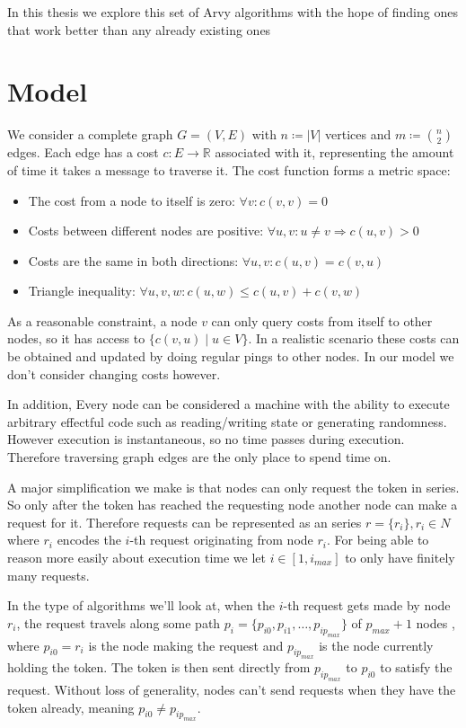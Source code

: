 \documentclass[a4paper, oneside]{discothesis}
\begin{document}
In this thesis we explore this set of Arvy algorithms with the hope of finding ones that work better than any already existing ones

\section{Model}

We consider a complete graph $G=(V,E)$ with $n\coloneqq|V|$ vertices and $m\coloneqq\binom{n}{2}$ edges. Each edge has a cost $c : E \rightarrow \mathbb{R}$ associated with it, representing the amount of time it takes a message to traverse it. The cost function forms a metric space:
\begin{itemize}
\item The cost from a node to itself is zero: $\forall v:c(v, v)=0$
\item Costs between different nodes are positive: $\forall u,v : u\neq v\Rightarrow c(u,v)>0$
\item Costs are the same in both directions: $\forall u,v : c(u,v)=c(v,u)$
\item Triangle inequality: $\forall u,v,w : c(u,w)\leq c(u,v)+c(v,w)$
\end{itemize}

As a reasonable constraint, a node $v$ can only query costs from itself to other nodes, so it has access to $\{c(v, u)\;|\;u\in V\}$. In a realistic scenario these costs can be obtained and updated by doing regular pings to other nodes. In our model we don't consider changing costs however.

In addition, Every node can be considered a machine with the ability to execute arbitrary effectful code such as reading/writing state or generating randomness. However execution is instantaneous, so no time passes during execution. Therefore traversing graph edges are the only place to spend time on.

A major simplification we make is that nodes can only request the token in series. So only after the token has reached the requesting node another node can make a request for it. Therefore requests can be represented as an series $r=\{r_i\},r_i\in N$ where $r_i$ encodes the $i$-th request originating from node $r_i$. For being able to reason more easily about execution time we let $i\in[1,i_{max}]$ to only have finitely many requests.

In the type of algorithms we'll look at, when the $i$-th request gets made by node $r_i$, the request travels along some path $p_i=\{p_{i0},p_{i1},\dots,p_{ip_{max}}\}$ of $p_{max}+1$ nodes , where $p_{i0}=r_i$ is the node making the request and $p_{ip_{max}}$ is the node currently holding the token. The token is then sent directly from $p_{ip_{max}}$ to $p_{i0}$ to satisfy the request. Without loss of generality, nodes can't send requests when they have the token already, meaning $p_{i0}\neq p_{ip_{max}}$.
\end{document}
